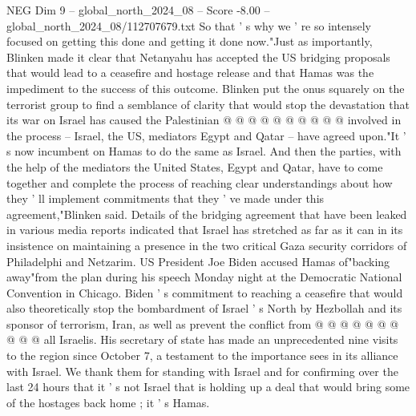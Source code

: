 \begin{textsample}{NEG Dim 9 – global\_north\_2024\_08 – Score -8.00 – global\_north\_2024\_08/112707679.txt}
So that ' s why we ' re so intensely focused on getting this done and getting it done now."Just as importantly, Blinken made it clear that Netanyahu has accepted the US bridging proposals that would lead to a ceasefire and hostage release and that Hamas was the impediment to the success of this outcome.
Blinken put the onus squarely on the terrorist group to find a semblance of clarity that would stop the devastation that its war on Israel has caused the Palestinian @ @ @ @ @ @ @ @ @ @ involved in the process -- Israel, the US, mediators Egypt and Qatar -- have agreed upon."It ' s now incumbent on Hamas to do the same as Israel.
And then the parties, with the help of the mediators the United States, Egypt and Qatar, have to come together and complete the process of reaching clear understandings about how they ' ll implement commitments that they ' ve made under this agreement,"Blinken said.
Details of the bridging agreement that have been leaked in various media reports indicated that Israel has stretched as far as it can in its insistence on maintaining a presence in the two critical Gaza security corridors of Philadelphi and Netzarim.
US President Joe Biden accused Hamas of"backing away"from the plan during his speech Monday night at the Democratic National Convention in Chicago.
Biden ' s commitment to reaching a ceasefire that would also theoretically stop the bombardment of Israel ' s North by Hezbollah and its sponsor of terrorism, Iran, as well as prevent the conflict from @ @ @ @ @ @ @ @ @ @ all Israelis.
His secretary of state has made an unprecedented nine visits to the region since October 7, a testament to the importance sees in its alliance with Israel.
We thank them for standing with Israel and for confirming over the last 24 hours that it ' s not Israel that is holding up a deal that would bring some of the hostages back home ; it ' s Hamas.

\end{textsample}
